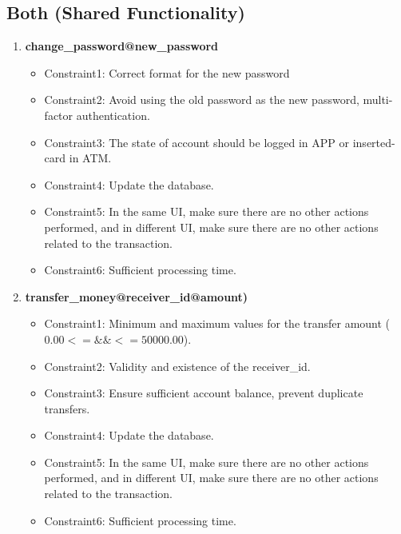 \documentclass[12pt]{article}
\begin{document}
\subsection{Both (Shared Functionality)}
\begin{enumerate}
    \item \textbf{change\_password@new\_password}
        \begin{itemize}
            \item Constraint1: Correct format for the new password 
            \item Constraint2: Avoid using the old password as the new password, multi-factor authentication.
            \item Constraint3: The state of account should be logged in APP or inserted-card in ATM.
            \item Constraint4: Update the database.
            \item Constraint5: In the same UI, make sure there are no other actions performed, and in different UI, make sure there are no other actions related to the transaction.
            \item Constraint6: Sufficient processing time.
        \end{itemize}


    \item \textbf{transfer\_money@receiver\_id@amount)}
        \begin{itemize}
            \item Constraint1: Minimum and maximum values for the transfer amount ($0.00<= \&\& <=50000.00$).
            \item Constraint2: Validity and existence of the receiver\_id.
            \item Constraint3: Ensure sufficient account balance, prevent duplicate transfers.
            \item Constraint4: Update the database.
            \item Constraint5: In the same UI, make sure there are no other actions performed, and in different UI, make sure there are no other actions related to the transaction.
            \item Constraint6: Sufficient processing time.
        \end{itemize}
        

\end{enumerate}
\end{document}
